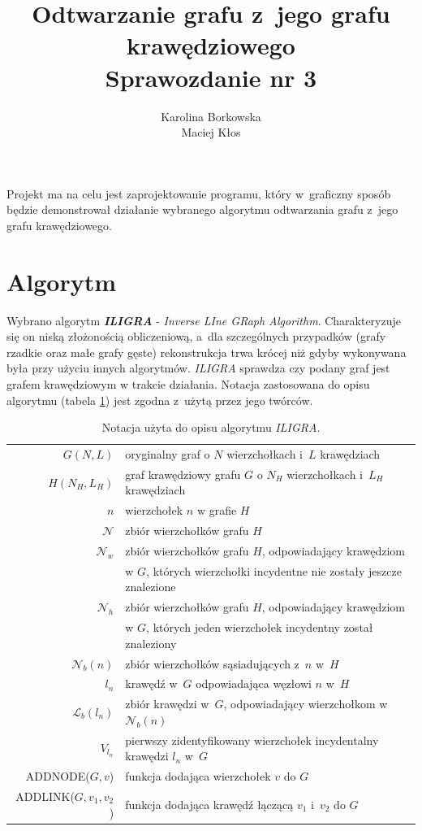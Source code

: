 \documentclass{article}
\date{}
\author{Karolina Borkowska \\ Maciej Kłos}
\title{Odtwarzanie grafu z~jego grafu krawędziowego\\
		{\large Sprawozdanie nr 3}}
\begin{document}
	\maketitle

Projekt ma na celu jest zaprojektowanie programu, który w~graficzny sposób będzie demonstrował
działanie wybranego algorytmu odtwarzania grafu z~jego grafu krawędziowego.

\section{Algorytm}

Wybrano algorytm \textbf{\textit{ILIGRA}}\cite{algo} - \textit{Inverse LIne GRaph Algorithm}. Charakteryzuje się on niską złożonością obliczeniową, a~dla szczególnych przypadków (grafy rzadkie oraz małe grafy gęste) rekonstrukcja trwa krócej niż gdyby wykonywana była przy użyciu innych algorytmów. \textit{ILIGRA} sprawdza czy podany graf jest grafem krawędziowym w trakcie działania. Notacja zastosowana do opisu algorytmu (tabela \ref{notacja}) jest zgodna z~użytą przez jego twórców. 

\begin{table}[H]
	\caption{Notacja użyta do opisu algorytmu \textit{ILIGRA}.}
	\label{notacja}

	
	\begin{tabular}{r l}
		\hline
		\hline
		$G(N,L)$&oryginalny graf o $N$ wierzchołkach i~$L$ krawędziach\\
		$H(N_H,L_H)$&graf krawędziowy grafu $G$ o $N_H$ wierzchołkach i~$L_H$ krawędziach\\
		$n$&wierzchołek $n$ w grafie $H$\\
		$\mathcal{N}$&zbiór wierzchołków grafu $H$\\
		$\mathcal{N}_w$&zbiór wierzchołków grafu $H$, odpowiadający krawędziom \\&w $G$, których wierzchołki incydentne nie zostały jeszcze znalezione\\
		$\mathcal{N}_h$&zbiór wierzchołków grafu $H$, odpowiadający krawędziom \\&w $G$, których jeden wierzchołek incydentny został znaleziony\\
		$\mathcal{N}_b(n)$&zbiór wierzchołków sąsiadujących z~$n$ w~$H$\\
		$l_n$&krawędź w~$G$ odpowiadająca węzłowi $n$ w~$H$\\
		$\mathcal{L}_b(l_n)$&zbiór krawędzi w~$G$, odpowiadający wierzchołkom w~$\mathcal{N}_b(n)$\\
		$V_{l_n}$&pierwszy zidentyfikowany wierzchołek incydentalny krawędzi $l_n$ w~$G$\\
		ADDNODE($G,v$)& funkcja dodająca wierzchołek $v$ do $G$\\
		ADDLINK($G,v_1,v_2$)&funkcja dodająca krawędź łączącą $v_1$ i~$v_2$ do $G$\\
 		\hline
	\end{tabular} 

\end{table}
\end{document}
